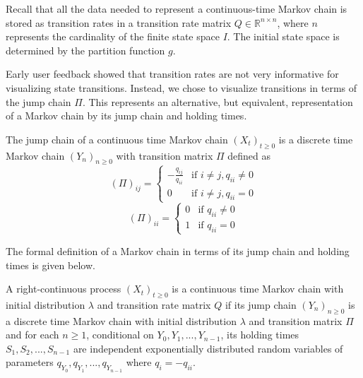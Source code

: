 Recall that all the data needed to represent a continuous-time Markov chain
is stored as transition rates in a transition rate matrix $Q \in \mathbb{R}^{n \times n}$, where $n$ represents
the cardinality of the finite state space $I$. The initial state space is determined by the  partition function $g$.

Early user feedback showed that transition rates are not very informative for visualizing state transitions. Instead, 
we chose to visualize transitions in terms of the jump chain $\Pi$.
This represents an alternative, but equivalent, representation of a Markov chain by its jump chain and holding times. 

The jump chain of a continuous time Markov chain $(X_t)_{t \ge 0}$ is
a discrete time Markov chain $(Y_n)_{n \ge 0}$ with transition matrix $\Pi$ defined as
\begin{equation}
	\nonumber
	\left(\Pi\right)_{ij} = 
		\left\{
			\begin{array}{ll}
				-\frac{q_{ij}}{q_{ii}} & \mbox{if } i \ne j, q_{ii} \ne 0 \\
				0 & \mbox{if } i \ne j, q_{ii} = 0
			\end{array}
		\right.
\end{equation}
\begin{equation}
	\nonumber
	\left(\Pi\right)_{ii} = 
		\left\{
			\begin{array}{ll}
				0 & \mbox{if } q_{ii} \ne 0 \\
				1 & \mbox{if } q_{ii} = 0
			\end{array}
		\right.
\end{equation}

The formal definition of a Markov chain in terms of its jump chain and holding times is given below.
\begin{defn}
	\label{def:jump-chain-holding-times}
	A right-continuous process $(X_t)_{t \ge 0}$ is a continuous time Markov chain with initial
	distribution $\lambda$ and transition rate matrix $Q$ if its jump chain $(Y_n)_{n \ge 0}$ is a 
	discrete time Markov chain with initial distribution $\lambda$ and transition matrix $\Pi$ 
	and
	for each $n \ge 1$, conditional on $Y_0, Y_1, ..., Y_{n-1}$, its holding times $S_1, S_2, ..., S_{n-1}$
	are independent exponentially distributed random variables of parameters $q_{Y_0}, q_{Y_1}, ..., q_{Y_{n-1}}$
	where $q_i = -q_{ii}$.
\end{defn}

